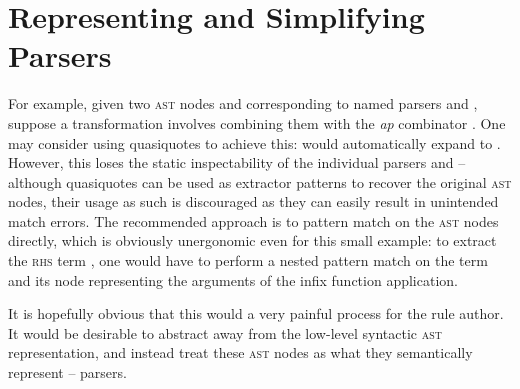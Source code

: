 \documentclass[../../../main.tex]{subfiles}
\begin{document}
\section{Representing and Simplifying Parsers}\label{sec:parser-representation}



For example, given two \textsc{ast} nodes  and  corresponding to named parsers  and , suppose a transformation involves combining them with the \emph{ap} combinator \scala{<*>}.
One may consider using quasiquotes to achieve this:  would automatically expand to .
However, this loses the static inspectability of the individual parsers  and  -- although quasiquotes can be used as extractor patterns to recover the original \textsc{ast} nodes, their usage as such is discouraged as they can easily result in unintended match errors. %
The recommended approach is to pattern match on the \textsc{ast} nodes directly, which is obviously unergonomic even for this small example: to extract the \textsc{rhs} term , one would have to perform a nested pattern match on the  term and its  node representing the arguments of the infix function application.

It is hopefully obvious that this would a very painful process for the rule author.
It would be desirable to abstract away from the low-level syntactic \textsc{ast} representation, and instead treat these \textsc{ast} nodes as what they semantically represent -- parsers.
\end{document}
